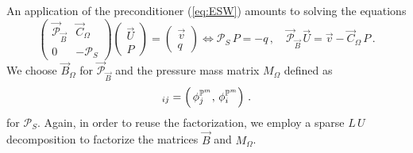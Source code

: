An application of the preconditioner (\ref{eq:ESW}) amounts to solving the
equations
\begin{equation*}
\begin{pmatrix}
\vec{\mathcal{P}}_{\vec B} & \vec C_\Omega \\
0 & -\mathcal{P}_S
\end{pmatrix}
\begin{pmatrix} \vec U \\ P \end{pmatrix}
= \begin{pmatrix} \vec v \\ q \end{pmatrix}
\iff
\mathcal{P}_S\,P = -q\,,\quad \vec{\mathcal{P}}_{\vec B}\,\vec U = \vec v -
\vec C_\Omega\,P\,.
\end{equation*}
We choose $\vec B_\Omega$  for $\vec{\mathcal{P}}_{\vec B}$ and the pressure
mass matrix $M_\Omega$ defined as
\begin{equation*}
[M_\Omega]_{ij} = \left(\,\phi_j^{\pspace^m},\, \phi_i^{\pspace^m}\right)\,.
\end{equation*}
for $\mathcal{P}_S$. Again, in order to reuse the factorization, we employ a
sparse $L\,U$ decomposition to factorize the matrices $\vec B$ and $M_\Omega$.

